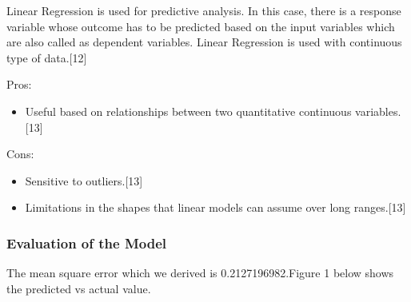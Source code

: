 \documentclass{article}
\begin{document}
Linear Regression is used for predictive analysis. In this case, there is a response variable whose outcome has to be predicted based on the input variables which are also called as dependent variables. Linear Regression is used with continuous type of data.[12] \newline

Pros:
\begin{itemize}
	\item Useful based on relationships between two quantitative continuous variables.[13]
\end{itemize}

Cons:
\begin{itemize}
	\item Sensitive to outliers.[13]
	\item Limitations in the shapes that linear models can assume over long ranges.[13]
\end{itemize}

\subsubsection{Evaluation of the Model}
The mean square error which we derived is  0.2127196982.Figure 1 below shows the predicted vs actual value.
\end{document}
